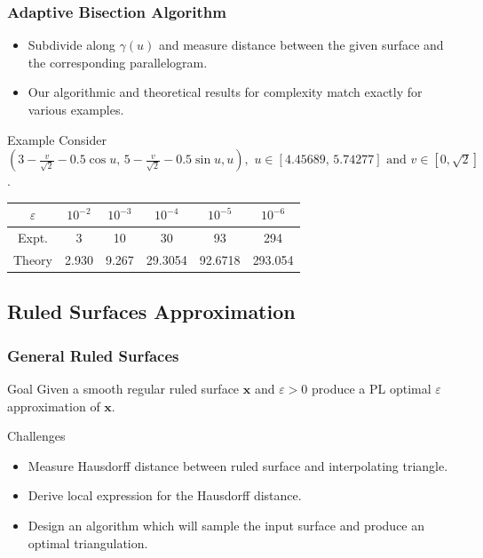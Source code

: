 \documentclass[ucs,9pt,pagenumbersfull]{beamer}
\begin{document}
\begin{frame}
  \frametitle{Adaptive Bisection Algorithm}
  \begin{itemize}
  \item Subdivide along \(\gamma(u)\) and measure distance
    between the given surface and the corresponding parallelogram.
  \item Our algorithmic and theoretical results for complexity match
    exactly for various examples.
  \end{itemize}
\begin{block}{Example}
  Consider \((3-\tfrac{v}{\sqrt{2}}-0.5\cos u,\,
  5-\tfrac{v}{\sqrt{2}}-0.5\sin u, u),\, \, u\in [4.45689,\,
  5.74277] \textrm{ and } v\in [0, \sqrt{2}]\).
  \begin{center}
    \begin{tabular}{|c|c|c|c|c|c|}
      \hline
      \(\varepsilon\) & \(10^{-2}\) & \(10^{-3}\) &
      \(10^{-4}\) & \(10^{-5}\) & \(10^{-6}\) \\ \hline
      Expt. & 3 & 10 & 30 & 93 & 294 \\ \hline
      Theory & 2.930 & 9.267 & 29.3054 & 92.6718 & 293.054 \\ \hline
    \end{tabular}
  \end{center}
\end{block}
\end{frame}

\subsection{Ruled Surfaces Approximation}

\begin{frame}
  \frametitle{General Ruled Surfaces}
  \begin{block}{Goal}
    Given a smooth regular ruled surface \(\mathbf{x}\) and
    \(\varepsilon>0\) produce a PL optimal \(\varepsilon\)
    approximation of \(\mathbf{x}\).
  \end{block}

  \begin{block}{Challenges}
    \begin{itemize}
    \item Measure Hausdorff distance between ruled surface and
      interpolating triangle.
    \item Derive local expression for the Hausdorff distance.
    \item Design an algorithm which will sample the input surface and
      produce an optimal triangulation.
    \end{itemize}
  \end{block}
\end{frame}
\end{document}
